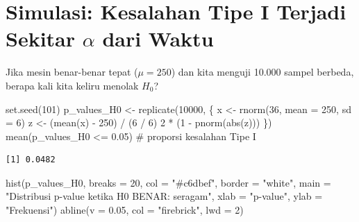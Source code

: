 \documentclass[
  indonesian,
  letterpaper,
]{book}
\newenvironment{Shaded}{\begin{snugshade}}{\end{snugshade}}
\newcommand{\AttributeTok}[1]{\textcolor[rgb]{0.40,0.45,0.13}{#1}}
\newcommand{\CommentTok}[1]{\textcolor[rgb]{0.37,0.37,0.37}{#1}}
\newcommand{\DecValTok}[1]{\textcolor[rgb]{0.68,0.00,0.00}{#1}}
\newcommand{\FloatTok}[1]{\textcolor[rgb]{0.68,0.00,0.00}{#1}}
\newcommand{\FunctionTok}[1]{\textcolor[rgb]{0.28,0.35,0.67}{#1}}
\newcommand{\NormalTok}[1]{\textcolor[rgb]{0.00,0.23,0.31}{#1}}
\newcommand{\OtherTok}[1]{\textcolor[rgb]{0.00,0.23,0.31}{#1}}
\newcommand{\SpecialCharTok}[1]{\textcolor[rgb]{0.37,0.37,0.37}{#1}}
\newcommand{\StringTok}[1]{\textcolor[rgb]{0.13,0.47,0.30}{#1}}
\begin{document}
\section{\texorpdfstring{Simulasi: Kesalahan Tipe I Terjadi Sekitar
\(\alpha\) dari
Waktu}{Simulasi: Kesalahan Tipe I Terjadi Sekitar \textbackslash alpha dari Waktu}}\label{simulasi-kesalahan-tipe-i-terjadi-sekitar-alpha-dari-waktu}

Jika mesin benar-benar tepat (\(\mu = 250\)) dan kita menguji 10.000
sampel berbeda, berapa kali kita keliru menolak \(H_0\)?

\begin{Shaded}
\begin{Highlighting}[]
\FunctionTok{set.seed}\NormalTok{(}\DecValTok{101}\NormalTok{)}
\NormalTok{p\_values\_H0 }\OtherTok{\textless{}{-}} \FunctionTok{replicate}\NormalTok{(}\DecValTok{10000}\NormalTok{, \{}
\NormalTok{  x }\OtherTok{\textless{}{-}} \FunctionTok{rnorm}\NormalTok{(}\DecValTok{36}\NormalTok{, }\AttributeTok{mean =} \DecValTok{250}\NormalTok{, }\AttributeTok{sd =} \DecValTok{6}\NormalTok{)}
\NormalTok{  z }\OtherTok{\textless{}{-}}\NormalTok{ (}\FunctionTok{mean}\NormalTok{(x) }\SpecialCharTok{{-}} \DecValTok{250}\NormalTok{) }\SpecialCharTok{/}\NormalTok{ (}\DecValTok{6} \SpecialCharTok{/} \DecValTok{6}\NormalTok{)}
  \DecValTok{2} \SpecialCharTok{*}\NormalTok{ (}\DecValTok{1} \SpecialCharTok{{-}} \FunctionTok{pnorm}\NormalTok{(}\FunctionTok{abs}\NormalTok{(z)))}
\NormalTok{\})}
\FunctionTok{mean}\NormalTok{(p\_values\_H0 }\SpecialCharTok{\textless{}=} \FloatTok{0.05}\NormalTok{)   }\CommentTok{\# proporsi kesalahan Tipe I}
\end{Highlighting}
\end{Shaded}

\begin{verbatim}
[1] 0.0482
\end{verbatim}

\begin{Shaded}
\begin{Highlighting}[]
\FunctionTok{hist}\NormalTok{(p\_values\_H0, }\AttributeTok{breaks =} \DecValTok{20}\NormalTok{, }\AttributeTok{col =} \StringTok{"\#c6dbef"}\NormalTok{, }\AttributeTok{border =} \StringTok{"white"}\NormalTok{,}
     \AttributeTok{main =} \StringTok{"Distribusi p{-}value ketika H0 BENAR: seragam"}\NormalTok{, }\AttributeTok{xlab =} \StringTok{"p{-}value"}\NormalTok{, }\AttributeTok{ylab =} \StringTok{"Frekuensi"}\NormalTok{)}
\FunctionTok{abline}\NormalTok{(}\AttributeTok{v =} \FloatTok{0.05}\NormalTok{, }\AttributeTok{col =} \StringTok{"firebrick"}\NormalTok{, }\AttributeTok{lwd =} \DecValTok{2}\NormalTok{)}
\end{Highlighting}
\end{Shaded}
\end{document}
